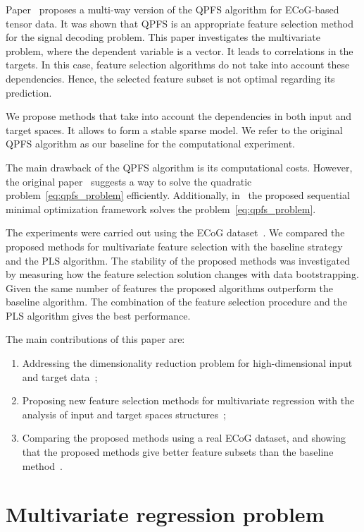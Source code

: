 \documentclass[preprint,authoryear,12pt]{elsarticle}
\theoremstyle{definition}
\begin{document}
Paper~\citep{motrenko2018multi} proposes a multi-way version of the QPFS algorithm for ECoG-based tensor data. 
It was shown that QPFS is an appropriate feature selection method for the signal decoding problem.
This paper investigates the multivariate problem, where the dependent variable is a vector. 
It leads to correlations in the targets. 
In this case, feature selection algorithms do not take into account these dependencies.
Hence, the selected feature subset is not optimal regarding its prediction.

We propose methods that take into account the dependencies in both input and target spaces. 
It allows to form a stable sparse model.
We refer to the original QPFS algorithm as our baseline for the computational experiment.

The main drawback of the QPFS algorithm is its computational costs. However, the original paper~\citep{rodriguez2010quadratic} suggests a way to solve the quadratic problem~\eqref{eq:qpfs_problem} efficiently. Additionally, in~\citep{prasad2013scaling} the proposed sequential minimal optimization framework solves the problem~\eqref{eq:qpfs_problem}.

The experiments were carried out using the ECoG dataset~\citep{shimoda2012decoding}.
We compared the proposed methods for multivariate feature selection with the baseline strategy and the PLS algorithm. 
The stability of the proposed methods was investigated by measuring how the feature selection solution changes with data bootstrapping.
Given the same number of features the proposed algorithms outperform the baseline algorithm. 
The combination of the feature selection procedure and the PLS algorithm gives the best performance.

The main contributions of this paper are:
\begin{enumerate}
	\item Addressing the dimensionality reduction problem for high-dimensional input and target data~\citep{isachenko2018plsdestech};
	\item Proposing new feature selection methods for multivariate regression with the analysis of input and target spaces structures~\citep{katrutsa2017comprehensive};
	\item Comparing the proposed methods using a real ECoG dataset, and showing that the proposed methods give better feature subsets than the baseline method~\citep{motrenko2018multi}.
\end{enumerate}


\section{Multivariate regression problem}
\end{document}
